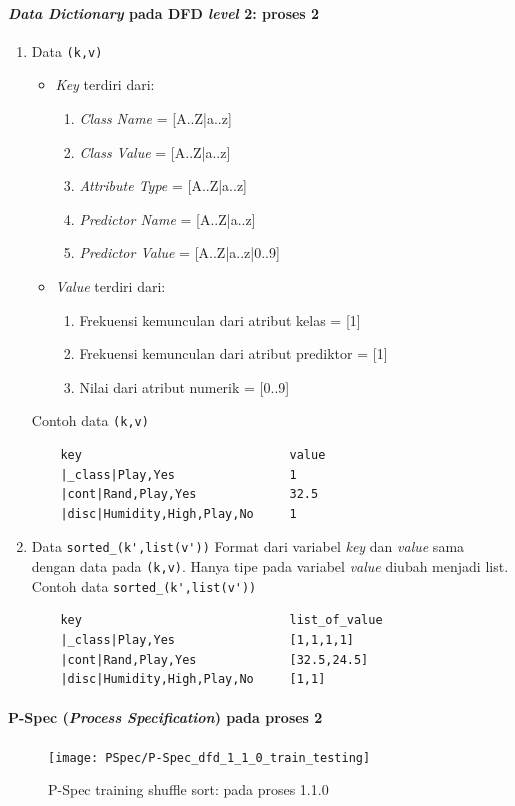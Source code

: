 \paragraph{\textit{Data Dictionary} pada DFD \textit{level} 2: proses 2}
\begin{enumerate}
	\item{Data \verb|(k,v)|}
	\begin{itemize}
		\item \textit{Key} terdiri dari:
		\begin{enumerate}
			\item \textit{Class Name} = [A..Z|a..z] 
			\item \textit{Class Value} = [A..Z|a..z] 
			\item \textit{Attribute Type} = [A..Z|a..z] 
			\item \textit{Predictor Name} = [A..Z|a..z]
			\item \textit{Predictor Value} = [A..Z|a..z|0..9]
		\end{enumerate}
		\item \textit{Value} terdiri dari:
		\begin{enumerate}
			\item Frekuensi kemunculan dari atribut kelas = [1]
			\item Frekuensi kemunculan dari atribut prediktor = [1]
			\item Nilai dari atribut numerik = [0..9]
		\end{enumerate}
	\end{itemize}
	Contoh data \verb|(k,v)|
	\begin{lstlisting}
	key								value
	|_class|Play,Yes				1
	|cont|Rand,Play,Yes				32.5
	|disc|Humidity,High,Play,No		1
	\end{lstlisting}
	
	\item{Data \verb|sorted_(k',list(v'))|}
	Format dari variabel \textit{key} dan \textit{value} sama dengan data pada \verb|(k,v)|. Hanya tipe pada variabel \textit{value} diubah menjadi list.\\
	Contoh data \verb|sorted_(k',list(v'))|
	\begin{lstlisting}
	key								list_of_value
	|_class|Play,Yes				[1,1,1,1]
	|cont|Rand,Play,Yes				[32.5,24.5]
	|disc|Humidity,High,Play,No		[1,1]
	\end{lstlisting}
\end{enumerate}

\paragraph{P-Spec (\textit{Process Specification}) pada proses 2}
\begin{figure}[H]
	\centering
	\texttt{[image: PSpec/P-Spec\_dfd\_1\_1\_0\_train\_testing]}
	\caption[P-Spec training reduce: pada proses 1.1.0]{P-Spec training shuffle sort: pada proses 1.1.0}
	\label{fig:P-Spec training shuffle sort: pada proses 1.1.0}
\end{figure}


